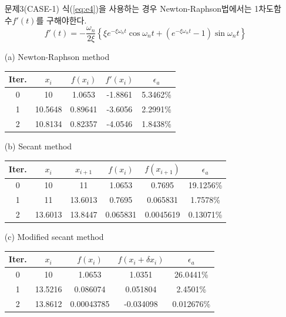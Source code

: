 \documentclass[a4,10pt]{article}
\numberwithin{algorithm}{section}
\theoremstyle{examplestyle}
\let\\\tabularnewline
\let\\\tabularnewline
\begin{document}
\clearpage
\begin{itemize}
\item[문제3(CASE-1)] 식(\ref{eq:e4})을 사용하는 경우 Newton-Raphson법에서는 1차도함수$f'(t)$를 구해야한다.
\begin{equation}
f'(t)=-\frac{\omega_{n}}{2\xi}\left\{\xi e^{-\xi\omega_{n}t}\cos\omega_{n}t+\left(e^{-\xi\omega_{n}t}-1\right)\sin\omega_{n}t\right\}
\end{equation}
\item[(a)] Newton-Raphson method
\begin{table}[!hbpt]
\centering
\begin{tabular}{c|c|c|c|c}
\hline\hline
Iter.&$x_{i}$&$f(x_{i})$&$f'(x_{i})$&$\epsilon_{a}$\\
\hline
0&10&1.0653&-1.8861&5.3462\%\\
1&10.5648&0.89641&-3.6056&2.2991\%\\
2&10.8134&0.82357&-4.0546&1.8438\%\\
\hline\hline
\end{tabular}
\end{table}

\item[(b)] Secant method
\begin{table}[!hbpt]
\centering
\begin{tabular}{c|c|c|c|c|c}
\hline\hline
Iter.&$x_{i}$&$x_{i+1}$&$f(x_{i})$&$f(x_{i+1})$&$\epsilon_{a}$\\
\hline
0&10&11&1.0653&0.7695&19.1256\%\\
1&11&13.6013&0.7695&0.065831&1.7578\%\\
2&13.6013&13.8447&0.065831&0.0045619&0.13071\%\\
\hline\hline
\end{tabular}
\end{table}

\item[(c)] Modified secant method
\begin{table}[!hbpt]
\centering
\begin{tabular}{c|c|c|c|c}
\hline\hline
Iter.&$x_{i}$&$f(x_{i})$&$f(x_{i}+\delta x_{i})$&$\epsilon_{a}$\\
\hline
0&10&1.0653&1.0351&26.0441\%\\
1&13.5216&0.086074&0.051804&2.4501\%\\
2&13.8612&0.00043785&-0.034098&0.012676\%\\
\hline\hline
\end{tabular}
\end{table}
\end{itemize}
\end{document}
